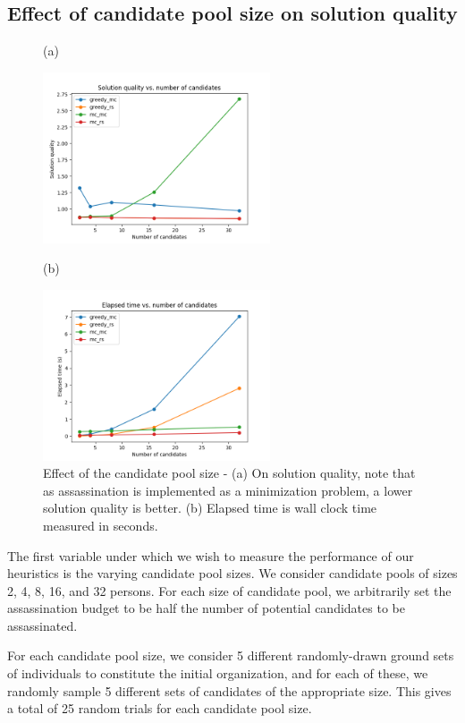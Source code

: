 \subsection{Effect of candidate pool size on solution quality}
\label{section:num-candidates}

\begin{figure}[h!]
	\centering
	(a) 
	
	\includegraphics[width=0.6\textwidth]{figs/num_candidates_multi_ground_set_plot.png}
	
	(b) 
	
	\includegraphics[width=0.6\textwidth]{figs/num_candidates_multi_ground_set_times_plot.png}
	\caption{ Effect of the candidate pool size - (a) On solution quality, note that as assassination is implemented as a minimization problem, a lower solution quality is better. (b) Elapsed time is wall clock time measured in seconds.}
	\label{fig:num-candidates}
\end{figure} 

The first variable under which we wish to measure the performance of our heuristics is the varying candidate pool sizes.
We consider candidate pools of sizes 2, 4, 8, 16, and 32 persons.
For each size of candidate pool, we arbitrarily set the assassination budget to be half the number of potential candidates to be assassinated.

For each candidate pool size, we consider 5 different randomly-drawn ground sets of individuals to constitute the initial organization, and for each of these, we randomly sample 5 different sets of candidates of the appropriate size.
This gives a total of 25 random trials for each candidate pool size.

